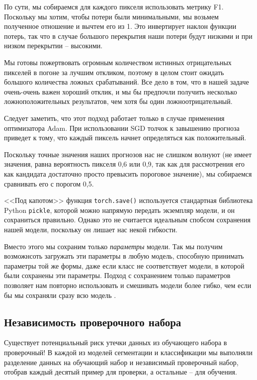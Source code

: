 \documentclass[%
	11pt,
	a4paper,
	utf8,
		]{article}
\begin{document}
По сути, мы собираемся для каждого пикселя использовать метрику F1. Поскольку мы хотим, чтобы потери были минимальными, мы возьмем полученное отношение и вычтем его из 1. Это инвертирует наклон функции потерь, так что в случае большого перекрытия наши потери будут низкими и при низком перекрытии -- высокими. 

Мы готовы пожертвовать огромным количеством истинных отрицательных пикселей в погоне за лучшим откликом, поэтому в целом стоит ожидать большого количества ложных срабатываний. Все дело в том, что в нашей задаче очень-очень важен хороший отклик, и мы бы предпочли получить несколько ложноположительных результатов, чем хотя бы один ложноотрицательный.

Следует заметить, что этот подход работает только в случае применения оптимизатора Adam. При использовании SGD толчок к завышению прогноза приведет к тому, что каждый пиксель начнет определяться как положительный. 

Поскольку точные значения наших прогнозов нас не слишком волнуют (не имеет значения, равна вероятность пикселя 0,6 или 0,9, так как для рассмотрения его как кандидата достаточно просто превысить пороговое значение), мы собираемся сравнивать его с порогом 0,5.

<<Под капотом>> функция \verb|torch.save()| используется стандартная библиотека Python \verb|pickle|, которой можно напрямую передать экземпляр модели, и он сохраниться правильно. Однако это не считается идеальным спобсом сохранения нашей модели, поскольку он лишает нас некой гибкости.

Вместо этого мы сохраним только \emph{параметры} модели. Так мы получим возможнсоть загружать эти параметры в любую модель, способную принимать параметры той же формы, даже если класс не соответствует модели, в которой были сохранены эти параметры. Подход с сохранением только параметров позволяет нам повторно использовать и смешивать модели более гибко, чем если бы мы сохраняли сразу всю модель \cite[]{pytorch-2022}.

\subsection{Независимость проверочного набора}

Существует потенциальный риск утечки данных из обучающего набора в проверочный! В каждой из моделей сегментации и классификации мы выполняли разделение данных на обучающий набор и независимый проверочный набор, отобрав каждый десятый пример для проверки, а остальные -- для обучения.
\end{document}
